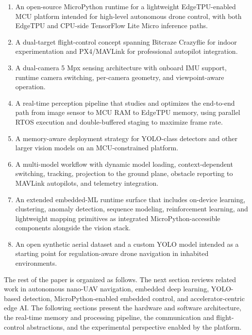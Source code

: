 \begin{enumerate}
\def\labelenumi{\arabic{enumi}.}
\tightlist
\item
  An open-source MicroPython runtime for a lightweight EdgeTPU-enabled
  MCU platform intended for high-level autonomous drone control, with
  both EdgeTPU and CPU-side TensorFlow Lite Micro inference paths.
\item
  A dual-target flight-control concept spanning Bitcraze Crazyflie for
  indoor experimentation and PX4/MAVLink for professional autopilot
  integration.
\item
  A dual-camera 5 Mpx sensing architecture with onboard IMU support,
  runtime camera switching, per-camera geometry, and viewpoint-aware
  operation.
\item
  A real-time perception pipeline that studies and optimizes the
  end-to-end path from image sensor to MCU RAM to EdgeTPU memory, using
  parallel RTOS execution and double-buffered staging to maximize frame
  rate.
\item
  A memory-aware deployment strategy for YOLO-class detectors and other
  larger vision models on an MCU-constrained platform.
\item
  A multi-model workflow with dynamic model loading, context-dependent
  switching, tracking, projection to the ground plane, obstacle
  reporting to MAVLink autopilots, and telemetry integration.
\item
  An extended embedded-ML runtime surface that includes on-device
  learning, clustering, anomaly detection, sequence modeling,
  reinforcement learning, and lightweight mapping primitives as
  integrated MicroPython-accessible components alongside the vision
  stack.
\item
  An open synthetic aerial dataset and a custom YOLO model intended as a
  starting point for regulation-aware drone navigation in inhabited
  environments.
\end{enumerate}

The rest of the paper is organized as follows. The next section reviews
related work in autonomous nano-UAV navigation, embedded deep learning,
YOLO-based detection, MicroPython-enabled embedded control, and
accelerator-centric edge AI. The following sections present the hardware
and software architecture, the real-time memory and processing pipeline,
the communication and flight-control abstractions, and the experimental
perspective enabled by the platform.
